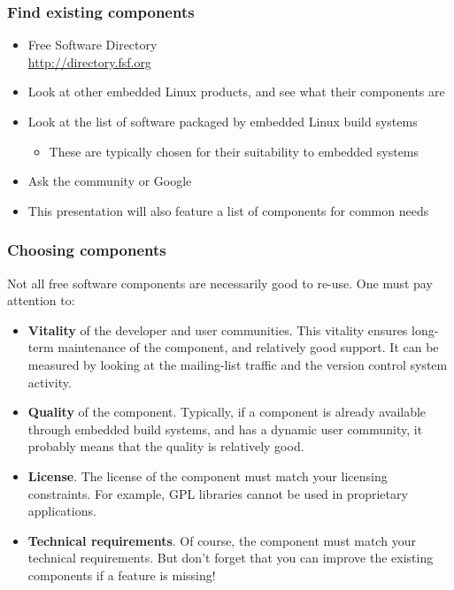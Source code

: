 \begin{frame}
  \frametitle{Find existing components}
  \begin{itemize}
  \item Free Software Directory\\
    \url{http://directory.fsf.org}
  \item Look at other embedded Linux products, and see what their
    components are
  \item Look at the list of software packaged by embedded Linux build
    systems
    \begin{itemize}
    \item These are typically chosen for their suitability to embedded
      systems
    \end{itemize}
  \item Ask the community or Google
  \item This presentation will also feature a list of components for
    common needs
  \end{itemize}
\end{frame}

\begin{frame}
  \frametitle{Choosing components}
  Not all free software components are necessarily good to
  re-use. One must pay attention to:
  \begin{itemize}
  \item {\bf Vitality} of the developer and user communities. This
    vitality ensures long-term maintenance of the component, and
    relatively good support. It can be measured by looking at the
    mailing-list traffic and the version control system activity.
  \item {\bf Quality} of the component. Typically, if a component is
    already available through embedded build systems, and has a
    dynamic user community, it probably means that the quality is
    relatively good.
  \item {\bf License}. The license of the component must match your
    licensing constraints. For example, GPL libraries cannot be used
    in proprietary applications.
  \item {\bf Technical requirements}. Of course, the component must
    match your technical requirements. But don't forget that you can
    improve the existing components if a feature is missing!
  \end{itemize}
\end{frame}

